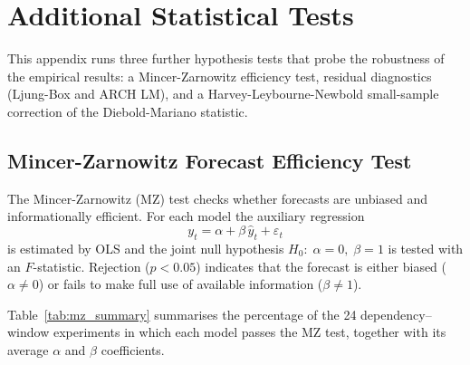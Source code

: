 \section{Additional Statistical Tests}
\label{app:tests}

This appendix runs three further hypothesis tests that probe the robustness of
the empirical results: a Mincer-Zarnowitz efficiency test, residual diagnostics
(Ljung-Box and ARCH LM), and a Harvey-Leybourne-Newbold small-sample correction
of the Diebold-Mariano statistic.

\subsection{Mincer-Zarnowitz Forecast Efficiency Test}

The Mincer-Zarnowitz (MZ) test \cite{mincer1969economic} checks whether forecasts
are unbiased and informationally efficient.
For each model the auxiliary regression
\begin{equation}
    y_t = \alpha + \beta\,\hat{y}_t + \varepsilon_t
\end{equation}
is estimated by OLS and the joint null hypothesis $H_0{:}\;\alpha = 0,\;\beta = 1$
is tested with an $F$-statistic.
Rejection ($p < 0.05$) indicates that the forecast is either biased ($\alpha \neq 0$)
or fails to make full use of available information ($\beta \neq 1$).

Table~\ref{tab:mz_summary} summarises the percentage of the 24
dependency–window experiments in which each model passes the MZ test,
together with its average $\alpha$ and $\beta$ coefficients.

